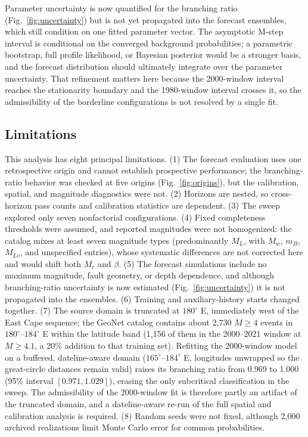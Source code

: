 \documentclass[12pt]{article}
\begin{document}
Parameter uncertainty is now quantified for the branching ratio
(Fig.~\ref{fig:uncertainty}) but is not yet propagated into the forecast
ensembles, which still condition on one fitted parameter vector. The asymptotic
M-step interval is conditional on the converged background probabilities; a
parametric bootstrap, full profile likelihood, or Bayesian posterior would be a
stronger basis, and the forecast distribution should ultimately integrate over
the parameter uncertainty. That refinement matters here because the 2000-window
interval reaches the stationarity boundary and the 1980-window interval crosses
it, so the admissibility of the borderline configurations is not resolved by a
single fit.

\subsection*{Limitations}

This analysis has eight principal limitations. (1) The forecast evaluation uses
one retrospective origin and cannot establish prospective performance; the
branching-ratio behavior was checked at five origins
(Fig.~\ref{fig:origins}), but the calibration, spatial, and magnitude diagnostics
were not. (2) Horizons are nested, so cross-horizon pass counts and calibration
statistics are dependent. (3) The sweep explored only seven nonfactorial
configurations. (4) Fixed completeness thresholds were assumed, and reported
magnitudes were not homogenized: the catalog mixes at least seven magnitude
types (predominantly $M_L$, with $M_w$, $m_B$, $M_{Lv}$, and unspecified
entries), whose systematic differences are not corrected here and would shift
both $M_c$ and $\beta$. (5) The forecast simulations include no maximum
magnitude, fault geometry, or depth dependence, and although branching-ratio
uncertainty is now estimated (Fig.~\ref{fig:uncertainty}) it is not propagated
into the ensembles. (6) Training and auxiliary-history starts changed together.
(7) The source domain is truncated at $180^\circ$ E, immediately west of the
East Cape sequence; the GeoNet catalog contains about 2{,}730 $M\geq4$ events in
$180^\circ$--$184^\circ$ E within the latitude band (1{,}156 of them in the
2000--2021 window at $M\geq4.1$, a 20\% addition to that training set).
Refitting the 2000-window model on a buffered, dateline-aware domain
($165^\circ$--$184^\circ$ E, longitudes unwrapped so the great-circle distances
remain valid) raises its branching ratio from 0.969 to 1.000 (95\% interval
$[0.971,1.029]$), erasing the only subcritical classification in the sweep. The
admissibility of the 2000-window fit is therefore partly an artifact of the
truncated domain, and a dateline-aware re-run of the full spatial and calibration
analysis is required. (8) Random
seeds were not fixed, although 2,000 archived realizations limit Monte Carlo
error for common probabilities.
\end{document}
